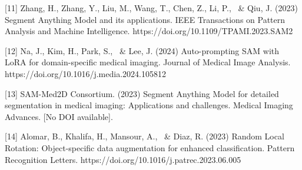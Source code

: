 \documentclass{article}
\begin{document}
[11] Zhang, H., Zhang, Y., Liu, M., Wang, T., Chen, Z., Li, P., \ \& Qiu, J. (2023) Segment Anything Model and its applications. IEEE Transactions on Pattern Analysis and Machine Intelligence. https://doi.org/10.1109/TPAMI.2023.SAM2

[12] Na, J., Kim, H., Park, S., \ \& Lee, J. (2024) Auto-prompting SAM with LoRA for domain-specific medical imaging. Journal of Medical Image Analysis. https://doi.org/10.1016/j.media.2024.105812

[13] SAM-Med2D Consortium. (2023) Segment Anything Model for detailed segmentation in medical imaging: Applications and challenges. Medical Imaging Advances. [No DOI available].

[14] Alomar, B., Khalifa, H., Mansour, A., \ \& Diaz, R. (2023) Random Local Rotation: Object-specific data augmentation for enhanced classification. Pattern Recognition Letters. https://doi.org/10.1016/j.patrec.2023.06.005
\end{document}
